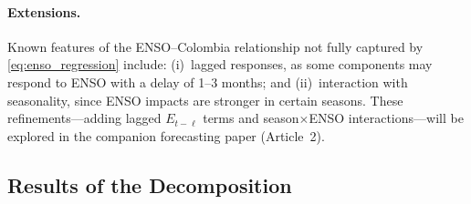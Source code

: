 \documentclass[12pt]{article}
\begin{document}
\paragraph{Extensions.} Known features of the ENSO--Colombia relationship not fully captured by \eqref{eq:enso_regression} include: (i)~lagged responses, as some components may respond to ENSO with a delay of 1--3 months; and (ii)~interaction with seasonality, since ENSO impacts are stronger in certain seasons. These refinements---adding lagged $E_{t-\ell}$ terms and season$\times$ENSO interactions---will be explored in the companion forecasting paper (Article~2).

\subsection{Results of the Decomposition}
\end{document}
